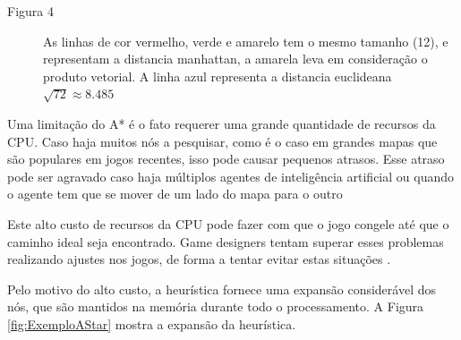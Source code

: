 \begin{description}
    \item[Figura 4] As linhas de cor vermelho, verde e amarelo tem o mesmo tamanho (12), e representam a distancia manhattan, a amarela leva em consideração o produto vetorial.
    A linha azul representa a distancia euclideana $\sqrt{72} \approx 8.485$
\end{description}

Uma limitação do A* é o fato requerer uma grande quantidade de recursos da CPU. Caso haja muitos nós a pesquisar, como é o caso em grandes mapas que são populares em jogos recentes, isso  pode causar pequenos atrasos.
Esse atraso pode ser agravado caso haja múltiplos agentes de inteligência artificial ou quando o agente tem que se mover de um lado do mapa para o outro 

Este alto custo de recursos da CPU pode fazer com que o jogo congele até que o caminho ideal seja encontrado. Game designers tentam superar esses problemas realizando ajustes nos jogos, de forma a tentar evitar estas situações \cite{Timothy}.

Pelo motivo do alto custo, a heurística fornece uma expansão considerável dos nós, que são mantidos na memória durante todo o processamento. A Figura \ref{fig:ExemploAStar} mostra a expansão da heurística.

\begin{minipage}{\linewidth}
    \label{fig:ExemploAStar}
\end{minipage}

